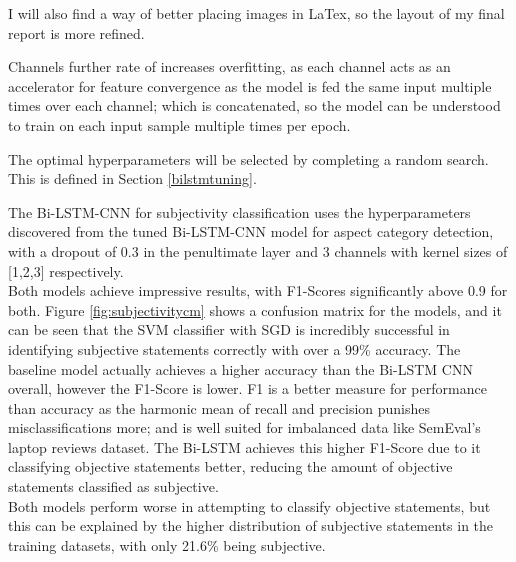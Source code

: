 I will also find a way of better placing images in LaTex, so the layout of my final report is more refined. 
\newpage


Channels further rate of increases overfitting, as each channel acts as an accelerator for feature convergence as the model is fed the same input multiple times over each channel; which is concatenated, so the model can be understood to train on each input sample multiple times per epoch. 


The optimal hyperparameters will be selected by completing a random search. This is defined in Section \ref{bilstmtuning}.


The Bi-LSTM-CNN for subjectivity classification uses the hyperparameters discovered from the tuned Bi-LSTM-CNN model for aspect category detection, with a dropout of 0.3 in the penultimate layer and 3 channels with kernel sizes of [1,2,3] respectively.  \\
Both models achieve impressive results, with F1-Scores significantly above 0.9 for both. Figure \ref{fig:subjectivitycm} shows a confusion matrix for the models, and it can be seen that the SVM classifier with SGD is incredibly successful in identifying subjective statements correctly with over a 99\% accuracy. The baseline model actually achieves a higher accuracy than the Bi-LSTM CNN overall, however the F1-Score is lower. F1 is a better measure for performance than accuracy as the harmonic mean of recall and precision punishes misclassifications more; and is well suited for imbalanced data like SemEval's laptop reviews dataset. The Bi-LSTM achieves this higher F1-Score due to it classifying objective statements better, reducing the amount of objective statements classified as subjective.\\
Both models perform worse in attempting to classify objective statements, but this can be explained by the higher distribution of subjective statements in the training datasets, with only 21.6\% being subjective.  
